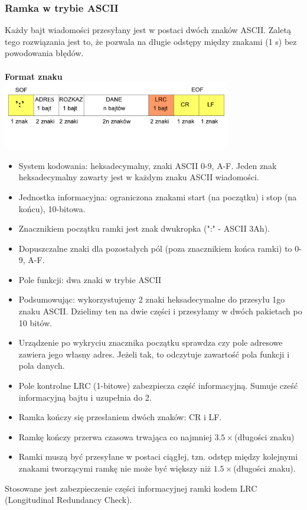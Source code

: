 		\subsubsection{Ramka w trybie ASCII}
			Każdy bajt wiadomości przesyłany jest w postaci dwóch znaków ASCII. Zaletą tego rozwiązania jest to, że pozwala na długie odstępy między znakami (1 s) bez powodowania błędów.\\\\\textbf{Format znaku}\\
			\includegraphics[width=10cm]{./wyklady/RS232_18_1.pdf}
			\begin{itemize}
				\item System kodowania: heksadecymalny, znaki ASCII 0-9, A-F. Jeden znak heksadecymalny zawarty jest w każdym znaku ASCII wiadomości.
				\item Jednostka informacyjna: ograniczona znakami start (na początku) i stop (na końcu), 10-bitowa.
				\item Znacznikiem początku ramki jest znak dwukropka (":" - ASCII 3Ah).
				\item Dopuszczalne znaki dla pozostałych pól (poza znacznikiem końca ramki) to 0-9, A-F.
				\item Pole funkcji: dwa znaki w trybie ASCII
				\item Podsumowując: wykorzystujemy 2 znaki heksadecymalne do przesyłu 1go znaku ASCII. Dzielimy ten na dwie części i przesyłamy w dwóch pakietach po 10 bitów.
				\item Urządzenie po wykryciu znacznika początku sprawdza czy pole adresowe zawiera jego własny adres. Jeżeli tak, to odczytuje zawartość pola funkcji i pola danych.
				\item Pole kontrolne LRC (1-bitowe) zabezpiecza część informacyjną. Sumuje cześć informacyjną bajtu i uzupełnia do 2.
				\item Ramka kończy się przesłaniem dwóch znaków: CR i LF.
				\item Ramkę kończy przerwa czasowa trwająca co najmniej $3.5\times$(długości znaku)
				\item Ramki muszą być przesyłane w postaci ciągłej, tzn. odstęp między kolejnymi znakami tworzącymi ramkę nie może być większy niż $1.5\times$(długości znaku).
			\end{itemize}
			Stosowane jest zabezpieczenie części informacyjnej ramki kodem LRC (Longitudinal Redundancy Check).
